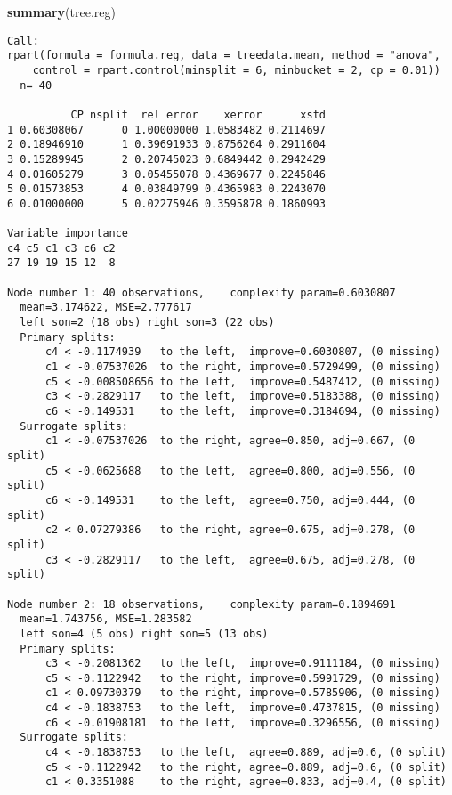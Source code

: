 \documentclass[]{article}
\newenvironment{Shaded}{\begin{snugshade}}{\end{snugshade}}
\newcommand{\KeywordTok}[1]{\textcolor[rgb]{0.13,0.29,0.53}{\textbf{{#1}}}}
\newcommand{\NormalTok}[1]{{#1}}
\begin{document}
\begin{Shaded}
\begin{Highlighting}[]
\KeywordTok{summary}\NormalTok{(tree.reg)}
\end{Highlighting}
\end{Shaded}

\begin{verbatim}
Call:
rpart(formula = formula.reg, data = treedata.mean, method = "anova", 
    control = rpart.control(minsplit = 6, minbucket = 2, cp = 0.01))
  n= 40 

          CP nsplit  rel error    xerror      xstd
1 0.60308067      0 1.00000000 1.0583482 0.2114697
2 0.18946910      1 0.39691933 0.8756264 0.2911604
3 0.15289945      2 0.20745023 0.6849442 0.2942429
4 0.01605279      3 0.05455078 0.4369677 0.2245846
5 0.01573853      4 0.03849799 0.4365983 0.2243070
6 0.01000000      5 0.02275946 0.3595878 0.1860993

Variable importance
c4 c5 c1 c3 c6 c2 
27 19 19 15 12  8 

Node number 1: 40 observations,    complexity param=0.6030807
  mean=3.174622, MSE=2.777617 
  left son=2 (18 obs) right son=3 (22 obs)
  Primary splits:
      c4 < -0.1174939   to the left,  improve=0.6030807, (0 missing)
      c1 < -0.07537026  to the right, improve=0.5729499, (0 missing)
      c5 < -0.008508656 to the left,  improve=0.5487412, (0 missing)
      c3 < -0.2829117   to the left,  improve=0.5183388, (0 missing)
      c6 < -0.149531    to the left,  improve=0.3184694, (0 missing)
  Surrogate splits:
      c1 < -0.07537026  to the right, agree=0.850, adj=0.667, (0 split)
      c5 < -0.0625688   to the left,  agree=0.800, adj=0.556, (0 split)
      c6 < -0.149531    to the left,  agree=0.750, adj=0.444, (0 split)
      c2 < 0.07279386   to the right, agree=0.675, adj=0.278, (0 split)
      c3 < -0.2829117   to the left,  agree=0.675, adj=0.278, (0 split)

Node number 2: 18 observations,    complexity param=0.1894691
  mean=1.743756, MSE=1.283582 
  left son=4 (5 obs) right son=5 (13 obs)
  Primary splits:
      c3 < -0.2081362   to the left,  improve=0.9111184, (0 missing)
      c5 < -0.1122942   to the right, improve=0.5991729, (0 missing)
      c1 < 0.09730379   to the right, improve=0.5785906, (0 missing)
      c4 < -0.1838753   to the left,  improve=0.4737815, (0 missing)
      c6 < -0.01908181  to the left,  improve=0.3296556, (0 missing)
  Surrogate splits:
      c4 < -0.1838753   to the left,  agree=0.889, adj=0.6, (0 split)
      c5 < -0.1122942   to the right, agree=0.889, adj=0.6, (0 split)
      c1 < 0.3351088    to the right, agree=0.833, adj=0.4, (0 split)


\end{verbatim}
\end{document}
